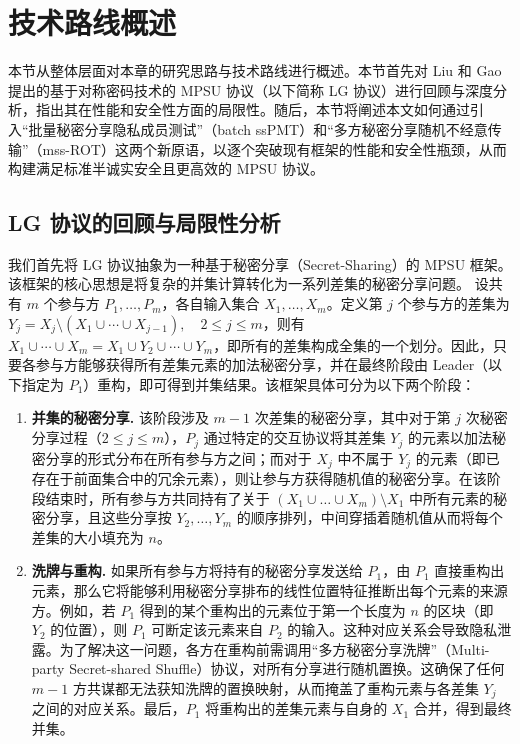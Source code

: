 \section{技术路线概述}

本节从整体层面对本章的研究思路与技术路线进行概述。本节首先对 Liu 和 Gao \cite{LG-ASIACRYPT-2023} 提出的基于对称密码技术的 MPSU 协议（以下简称 LG 协议）进行回顾与深度分析，指出其在性能和安全性方面的局限性。随后，本节将阐述本文如何通过引入“批量秘密分享隐私成员测试”（batch ssPMT）和“多方秘密分享随机不经意传输”（mss-ROT）这两个新原语，以逐个突破现有框架的性能和安全性瓶颈，从而构建满足标准半诚实安全且更高效的 MPSU 协议。

\subsection{LG 协议的回顾与局限性分析}

我们首先将 LG 协议抽象为一种基于秘密分享（Secret-Sharing）的 MPSU 框架。该框架的核心思想是将复杂的并集计算转化为一系列差集的秘密分享问题。
设共有 $m$ 个参与方 $P_1,\dots,P_m$，各自输入集合 $X_1,\dots,X_m$。定义第 $j$ 个参与方的差集为 $Y_j = X_j \setminus (X_1 \cup \cdots \cup X_{j-1}), \quad 2 \le j \le m$，则有 $X_1 \cup \cdots \cup X_m = X_1 \cup Y_2 \cup \cdots \cup Y_m$，即所有的差集构成全集的一个划分。因此，只要各参与方能够获得所有差集元素的加法秘密分享，并在最终阶段由 Leader（以下指定为 $P_1$）重构，即可得到并集结果。该框架具体可分为以下两个阶段：
\begin{enumerate}
    \item \textbf{并集的秘密分享.} 该阶段涉及 $m-1$ 次差集的秘密分享，其中对于第 $j$ 次秘密分享过程（$2 \le j \le m$），$P_j$ 通过特定的交互协议将其差集 $Y_j$ 的元素以加法秘密分享的形式分布在所有参与方之间；而对于 $X_j$ 中不属于 $Y_j$ 的元素（即已存在于前面集合中的冗余元素），则让参与方获得随机值的秘密分享。在该阶段结束时，所有参与方共同持有了关于 $(X_1 \cup \dots \cup X_m) \setminus X_1$ 中所有元素的秘密分享，且这些分享按 $Y_2, \dots, Y_m$ 的顺序排列，中间穿插着随机值从而将每个差集的大小填充为 $n$。
    
    \item \textbf{洗牌与重构.} 如果所有参与方将持有的秘密分享发送给 $P_1$，由 $P_1$ 直接重构出元素，那么它将能够利用秘密分享排布的线性位置特征推断出每个元素的来源方。例如，若 $P_1$ 得到的某个重构出的元素位于第一个长度为 $n$ 的区块（即 $Y_2$ 的位置），则 $P_1$ 可断定该元素来自 $P_2$ 的输入。这种对应关系会导致隐私泄露。为了解决这一问题，各方在重构前需调用“多方秘密分享洗牌”（Multi-party Secret-shared Shuffle）协议，对所有分享进行随机置换。这确保了任何 $m-1$ 方共谋都无法获知洗牌的置换映射，从而掩盖了重构元素与各差集 $Y_j$ 之间的对应关系。最后，$P_1$ 将重构出的差集元素与自身的 $X_1$ 合并，得到最终并集。
\end{enumerate}

